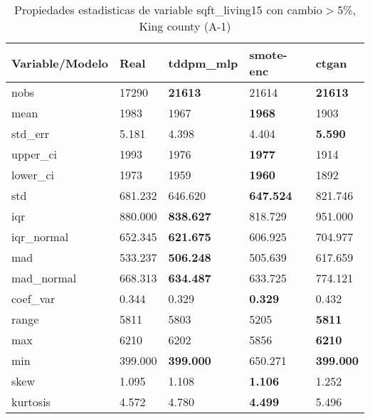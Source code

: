 \begin{table}[H]
\centering
\fontsize{8}{14}\selectfont
\caption{Propiedades estadisticas de variable sqft\_living15 con cambio\ensuremath{>}5\%, King county (A-1)}
\label{table-stats-king county-a-1-sqft_living15-short}
\begin{tabular}{|l|m{10em}|m{10em}|m{10em}|m{10em}|}
\hline
 \rowcolor[gray]{0.8}
Variable/Modelo & Real & tddpm\_mlp & smote-enc & ctgan \\
\hline nobs & 17290 & \bfseries 21613 & \cellcolor[rgb]{0.9, 0.54, 0.52} 21614 & \bfseries 21613 \\
\hline mean & 1983 & 1967 & \bfseries 1968 & \cellcolor[rgb]{0.9, 0.54, 0.52} 1903 \\
\hline std\_err & 5.181 & \cellcolor[rgb]{0.9, 0.54, 0.52} 4.398 & 4.404 & \bfseries 5.590 \\
\hline upper\_ci & 1993 & 1976 & \bfseries 1977 & \cellcolor[rgb]{0.9, 0.54, 0.52} 1914 \\
\hline lower\_ci & 1973 & 1959 & \bfseries 1960 & \cellcolor[rgb]{0.9, 0.54, 0.52} 1892 \\
\hline std & 681.232 & 646.620 & \bfseries 647.524 & \cellcolor[rgb]{0.9, 0.54, 0.52} 821.746 \\
\hline iqr & 880.000 & \bfseries 838.627 & 818.729 & \cellcolor[rgb]{0.9, 0.54, 0.52} 951.000 \\
\hline iqr\_normal & 652.345 & \bfseries 621.675 & 606.925 & \cellcolor[rgb]{0.9, 0.54, 0.52} 704.977 \\
\hline mad & 533.237 & \bfseries 506.248 & 505.639 & \cellcolor[rgb]{0.9, 0.54, 0.52} 617.659 \\
\hline mad\_normal & 668.313 & \bfseries 634.487 & 633.725 & \cellcolor[rgb]{0.9, 0.54, 0.52} 774.121 \\
\hline coef\_var & 0.344 & 0.329 & \bfseries 0.329 & \cellcolor[rgb]{0.9, 0.54, 0.52} 0.432 \\
\hline range & 5811 & 5803 & \cellcolor[rgb]{0.9, 0.54, 0.52} 5205 & \bfseries 5811 \\
\hline max & 6210 & 6202 & \cellcolor[rgb]{0.9, 0.54, 0.52} 5856 & \bfseries 6210 \\
\hline min & 399.000 & \bfseries 399.000 & \cellcolor[rgb]{0.9, 0.54, 0.52} 650.271 & \bfseries 399.000 \\
\hline skew & 1.095 & 1.108 & \bfseries 1.106 & \cellcolor[rgb]{0.9, 0.54, 0.52} 1.252 \\
\hline kurtosis & 4.572 & 4.780 & \bfseries 4.499 & \cellcolor[rgb]{0.9, 0.54, 0.52} 5.496 \\

\end{tabular}
\end{table}
